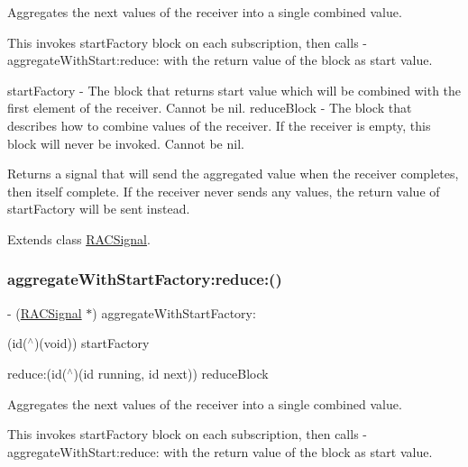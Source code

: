 Aggregates the {\ttfamily next} values of the receiver into a single combined value.

This invokes {\ttfamily start\+Factory} block on each subscription, then calls -\/aggregate\+With\+Start\+:reduce\+: with the return value of the block as start value.

start\+Factory -\/ The block that returns start value which will be combined with the first element of the receiver. Cannot be nil. reduce\+Block -\/ The block that describes how to combine values of the receiver. If the receiver is empty, this block will never be invoked. Cannot be nil.

Returns a signal that will send the aggregated value when the receiver completes, then itself complete. If the receiver never sends any values, the return value of {\ttfamily start\+Factory} will be sent instead. 

Extends class \mbox{\hyperlink{interface_r_a_c_signal_a51c08c7a357f83c96c468a6aa13d4d87}{R\+A\+C\+Signal}}.

\mbox{\label{category_r_a_c_signal_07_operations_08_a51c08c7a357f83c96c468a6aa13d4d87}} 
\subsubsection{\texorpdfstring{aggregate\+With\+Start\+Factory\+:reduce\+:()}{aggregateWithStartFactory:reduce:()}\hspace{0.1cm}{\footnotesize\ttfamily [3/3]}}
{\footnotesize\ttfamily -\/ (\mbox{\hyperlink{interface_r_a_c_signal}{R\+A\+C\+Signal}} $\ast$) aggregate\+With\+Start\+Factory\+: \begin{DoxyParamCaption}\item[{(id($^\wedge$)(void))}]{start\+Factory }\item[{reduce:(id($^\wedge$)(id running, id next))}]{reduce\+Block }\end{DoxyParamCaption}}

Aggregates the {\ttfamily next} values of the receiver into a single combined value.

This invokes {\ttfamily start\+Factory} block on each subscription, then calls -\/aggregate\+With\+Start\+:reduce\+: with the return value of the block as start value.

